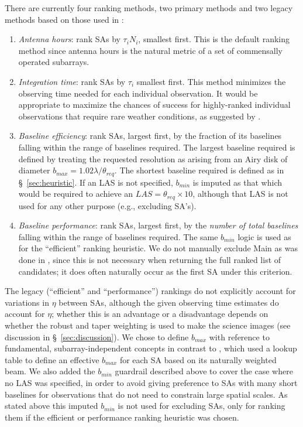 \documentclass[11pt]{article}
\begin{document}
There are currently four ranking methods, two primary methods and two
legacy methods based on those used in \cite{memo121}:
\begin{enumerate}
\item {\it Antenna hours}: rank SAs by $\tau_i N_i$, smallest first.
  This is the default ranking method since antenna hours is the
  natural metric of a set of commensally operated subarrays.
\item {\it Integration time}: rank SAs by $\tau_i$ smallest first.
  This method minimizes the observing time needed for each individual
  observation. It would be appropriate to maximize the chances
  of success for highly-ranked individual observations that require
  rare weather conditions, as suggested by \cite{saNarrative}.
\item {\it Baseline efficiency}: rank SAs, largest first, by the
  fraction of its baselines falling within the range of baselines
  required. The largest baseline required is defined by treating the
  requested resolution as arising from an Airy disk of diameter
  $b_{max} = 1.02 \lambda/\theta_{req}$.  The shortest baseline
  required is defined as in \S~\ref{sec:heuristic}.  If an LAS is not
  specified, $b_{min}$ is imputed as that which would be required to
  achieve an $LAS = \theta_{req} \times 10$, although that LAS is not
  used for any other purpose (e.g., excluding SA's).
\item {\it Baseline performance}: rank SAs, largest first, by the {\it
  number of total baselines} falling within the range of baselines
  required. The same $b_{min}$ logic is used as for the ``efficient''
  ranking heuristic. We do not manually exclude Main as was done in
  \cite{memo121}, since this is not necessary when returning the full
  ranked list of candidates; it does often naturally occur as the
  first SA under this criterion.
\end{enumerate}
The legacy (``efficient'' and ``performance'') rankings do not
explicitly account for variations in $\eta$ between SAs, although the
given observing time estimates do account for $\eta$; whether this is
an advantage or a disadvantage depends on whether the robust and taper
weighting is used to make the science images (see discussion in
\S~\ref{sec:discussion}).  We chose to define $b_{max}$ with reference
to fundamental, subarray-independent concepts in contrast to
\cite{memo121}, which used a lookup table to define an effective
$b_{max}$ for each SA based on its naturally weighted beam. We also
added the $b_{min}$ guardrail described above to cover the case where
no LAS was specified, in order to avoid giving preference to SAs with
many short baselines for observations that do not need to constrain
large spatial scales. As stated above this imputed $b_{min}$ is not
used for excluding SAs, only for ranking them if the efficient or
performance ranking heuristic was chosen.
\end{document}
